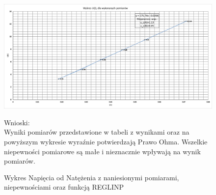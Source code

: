 \documentclass{article}
\begin{document}
\begin{figure}
    \begin{center}
        \includegraphics[width=\textwidth, angle=-90, scale=1.2]{new_graph.png}
        \caption{Wykres Napięcia od Natężenia z naniesionymi pomiarami, niepewnościami     
        oraz funkcją REGLINP}
    \end{center}
    Wnioski:\\
    Wyniki pomiarów przedstawione w tabeli z wynikami oraz na powyższym wykresie 
    wyraźnie potwierdzają Prawo Ohma. Wszelkie niepewności pomiarowe są małe i 
    nieznacznie wpływają na wynik pomiarów. 
\end{figure}
\end{document}
